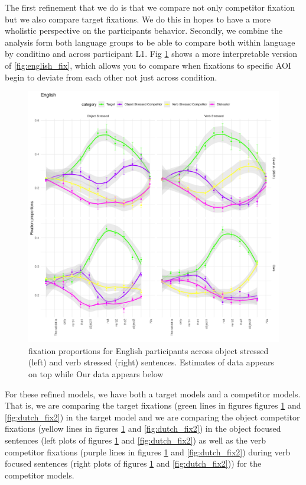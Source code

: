 The first refinement that we do is that we compare not only competitor fixation but we also compare target fixations. We do this in hopes to have a more wholistic perspective on the participants behavior. Secondly, we combine the analysis form both language groups to be able to compare both within language by conditino and across participant L1. Fig \ref{fig:english_fix2} shows a more interpretable version of \ref{fig:english_fix}, which allows you to compare when fixations to specific AOI begin to deviate from each other not just across condition.

\begin{figure}[H]  %
    \centering
    \includegraphics[width=\textwidth,height=\textheight,keepaspectratio]{viz/english_fix2.png}
    \caption{fixation proportions for English participants across object stressed (left) and verb stressed (right) sentences. Estimates of \citep{Ge2021} data appears on top while Our data appears below}
    \label{fig:english_fix2}
\end{figure}

For these refined models, we have both a target models and a competitor models. That is, we are comparing the target fixations (green lines in figures figures \ref{fig:english_fix2} and \ref{fig:dutch_fix2}) in the target model and we are comparing the object competitor fixations (yellow lines in figures \ref{fig:english_fix2} and \ref{fig:dutch_fix2}) in the object focused sentences (left plots of figures \ref{fig:english_fix2} and \ref{fig:dutch_fix2}) as well as the verb competitor fixations (purple lines in figures \ref{fig:english_fix2} and \ref{fig:dutch_fix2}) during verb focused sentences (right plots of figures \ref{fig:english_fix2} and \ref{fig:dutch_fix2})) for the competitor models. 

